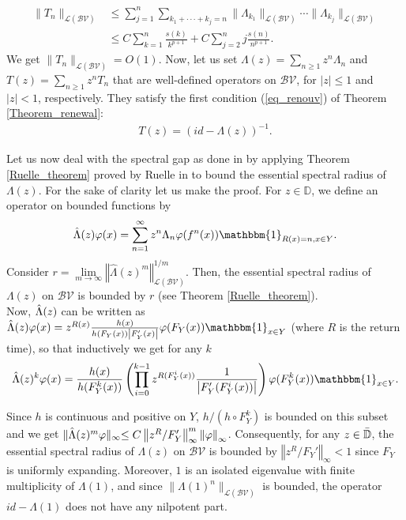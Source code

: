 \documentclass{ws-sd}
\newcommand{\indic}{\mathbbm{1}}
\newcommand{\norm}[1]{\left\Vert #1\right\Vert}
\newcommand{\abs}[1]{\left\lvert #1 \right\rvert}
\newcommand\bigp[1]{\left(#1\right)}
\begin{document}
\begin{align*}
    \lVert T_n \rVert_{\mathcal L(\mathcal{BV})} &\le \sum_{j=1}^n\sum_{k_1+\cdot \cdot \cdot+k_j=n}  \lVert \Lambda_{k_1}\rVert_{\mathcal L(\mathcal{BV})}\cdots \lVert \Lambda_{k_j}\rVert_{\mathcal{L}(\mathcal{BV})} \\
    &\le  C\sum_{k=1}^n \frac{s(k)}{k^{p+1}} + C\sum_{j=2}^n j\frac{s(n)}{n^{p+1}}.
\end{align*}
We get $ \lVert T_n \rVert_{\mathcal L (\mathcal{BV})} = O(1)$. Now, let us set $\Lambda(z) = \sum_{n\ge 1}z^n\Lambda_n$ and $T(z) = \sum_{n \ge 1}z^nT_n$ that are well-defined operators on $\mathcal{BV}$, for $\abs{z} \le 1 $ and $\abs{z} < 1$, respectively. They satisfy the first condition (\ref{eq_renouv}) of Theorem \ref{Theorem_renewal}:
\begin{align*}
    T(z) = (id-\Lambda(z))^{-1}.
\end{align*}

Let us now deal with the spectral gap as done in \cite{15} by applying Theorem \ref{Ruelle_theorem} proved by Ruelle in \cite{26} to bound the essential spectral radius of $\Lambda(z)$. For the sake of clarity let us make the proof. For $z \in \mathbb D$, we define an operator on bounded functions by
\begin{align*}
    \hat{\Lambda}(z)\varphi(x) = \sum_{n=1}^{\infty} z^n \Lambda_n \varphi(f^n(x)) \indic_{R(x)=n, x \in Y}.
\end{align*}
Consider $r = \underset{m \to \infty}{\lim} \norm{\hat{\Lambda}(z)^m}_{\mathcal L(\mathcal{BV})}^{1/m}$. Then, the essential spectral radius of $\Lambda(z)$ on $\mathcal{BV}$ is bounded by $r$ (see Theorem \ref{Ruelle_theorem}).
\\
Now, $\Hat{\Lambda}(z)$ can be written as $\Hat{\Lambda}(z)\varphi(x) = z^{R(x)}\frac{h(x)}{h(F_Y(x))\abs{F_Y'(x)}}\varphi(F_Y(x))\indic_{x \in Y}$ (where $R$ is the return time), so that inductively we get for any $k$
\begin{align*}
    \Hat{\Lambda}(z)^k\varphi(x) =  \frac{h(x)}{h(F_Y^k (x))}\bigp{\prod_{i=0}^{k-1}  z^{ R(F_Y^{i}(x))}\frac 1 {\abs{F_Y'(F_Y^{i}(x))}}}\varphi(F_Y^{k}(x))\indic_{x \in Y}.
\end{align*}

Since $h$ is continuous and positive on $Y$, $h/(h\circ F_Y^k)$ is bounded on this subset and we get $\lVert \Hat{\Lambda}(z)^m \varphi \lVert_{\infty} \le C \norm{z^{R}/F_Y'}_\infty^m \norm{\varphi}_{\infty}$.
Consequently, for any $z \in \Bar{\mathbb{D}}$, the essential spectral radius of $\Lambda(z)$ on $\mathcal{BV}$ is bounded by $\norm{z^{R}/F_Y'}_\infty < 1$ since $F_Y$ is uniformly expanding. Moreover, $1$ is an isolated eigenvalue with finite multiplicity of $\Lambda(1)$, and since $ \lVert \Lambda(1)^n \rVert_{\mathcal L(\mathcal{BV})}$ is bounded, the operator $id - \Lambda(1)$ does not have any nilpotent part.
\\
\end{document}
